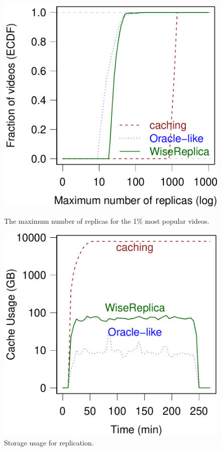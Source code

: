 \begin{figure}[htbp]
	\begin{minipage}[t]{0.48\linewidth}
		\includegraphics[width=.95\textwidth]{inputs/img/ecdf_replicas}
		\caption{The maximum number of replicas for the 1\% most popular videos.}
		\label{fig:replication_for_most_popular}
	\end{minipage}
	\hspace{0.1cm}
	\begin{minipage}[t]{0.48\linewidth}
     \includegraphics[width=.95\textwidth]{inputs/img/cache_usage}
		\caption{Storage usage for replication.}
		\label{fig:cache_usage_for_replication}
	\end{minipage}
\end{figure}


